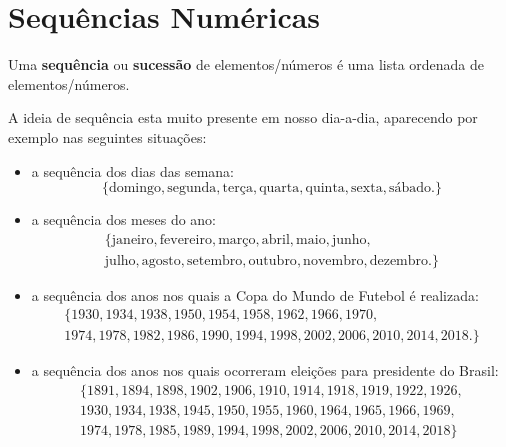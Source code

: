 \chapter{Sequências Numéricas}


\colorbox{azul}{
 \begin{minipage}{0.9\linewidth}
 \begin{center}
  Uma \textbf{sequência} ou \textbf{sucessão} de elementos/números é uma lista ordenada de elementos/números.
 \end{center}
 \end{minipage}}
 \vskip0.3cm


A ideia de sequência esta muito presente em nosso dia-a-dia, aparecendo por exemplo nas seguintes situações:
\begin{exem}
 \begin{itemize}
  Exemplos de sequências:
  \item a sequência dos dias das semana:\\
\[
\{\text{domingo}, \text{segunda}, \text{terça}, \text{quarta}, \text{quinta}, \text{sexta}, \text{sábado}.\}
\]
  \item a sequência dos meses do ano: \\
\begin{multline*}
\{\text{janeiro}, \text{fevereiro}, \text{março}, \text{abril}, \text{maio}, \text{junho}, \\
\text{julho}, \text{agosto}, \text{setembro}, \text{outubro}, \text{novembro}, \text{dezembro}.\}
\end{multline*}
  \item a sequência dos anos nos quais a Copa do Mundo de Futebol é realizada: \\
\begin{multline*}
\{1930, 1934, 1938, 1950, 1954, 1958, 1962, 1966, 1970, \\
1974, 1978, 1982, 1986, 1990, 1994, 1998, 2002, 2006, 2010, 2014, 2018.\}
\end{multline*}
  \item a sequência dos anos nos quais ocorreram eleições para presidente do Brasil: \\
\begin{multline*}
\{1891, 1894, 1898, 1902, 1906, 1910, 1914, 1918, 1919, 1922, 1926,\\ 1930, 1934, 1938, 1945, 1950, 1955, 1960, 1964, 1965, 1966, 1969,\\ 1974, 1978, 1985, 1989, 1994, 1998, 2002, 2006, 2010, 2014, 2018\}

\end{multline*}
\end{itemize}
\end{exem}

